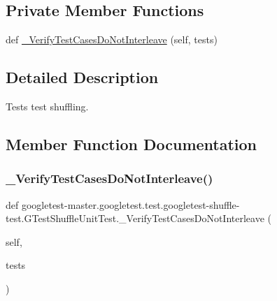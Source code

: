 \subsection*{Private Member Functions}
\begin{DoxyCompactItemize}
\item 
def \mbox{\hyperlink{classgoogletest-master_1_1googletest_1_1test_1_1googletest-shuffle-test_1_1_g_test_shuffle_unit_test_ac81a056f20da19f171831c82f4b740ae}{\+\_\+\+Verify\+Test\+Cases\+Do\+Not\+Interleave}} (self, tests)
\end{DoxyCompactItemize}


\subsection{Detailed Description}
\begin{DoxyVerb}Tests test shuffling.\end{DoxyVerb}
 

\subsection{Member Function Documentation}
\mbox{\label{classgoogletest-master_1_1googletest_1_1test_1_1googletest-shuffle-test_1_1_g_test_shuffle_unit_test_ac81a056f20da19f171831c82f4b740ae}} 
\subsubsection{\texorpdfstring{\_VerifyTestCasesDoNotInterleave()}{\_VerifyTestCasesDoNotInterleave()}}
{\footnotesize\ttfamily def googletest-\/master.\+googletest.\+test.\+googletest-\/shuffle-\/test.\+G\+Test\+Shuffle\+Unit\+Test.\+\_\+\+Verify\+Test\+Cases\+Do\+Not\+Interleave (\begin{DoxyParamCaption}\item[{}]{self,  }\item[{}]{tests }\end{DoxyParamCaption})\hspace{0.3cm}{\ttfamily [private]}}

